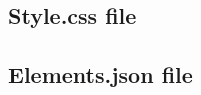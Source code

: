 \documentclass[a4paper,12pt]{article}
\begin{document}
\begin{appendices}


\newpage

\subsection{Style.css file}



\newpage

\subsection{Elements.json file}



\end{appendices}
\end{document}
